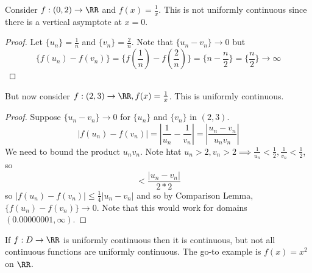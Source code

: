 \documentclass[12pt]{scrartcl}
\begin{document}
\begin{example}
  Consider $f: (0, 2) \to \RR$ and $f(x) = \frac{1}{x}$. This is not uniformly continuous
  since there is a vertical asymptote at $x=0$. 

  \begin{proof}
    Let $\{u_n\} = \frac{1}{n}$ and $\{v_n\} = \frac{2}{n}$. Note that $\{u_n - v_n\} \to 0$ but 
    \[\{f(u_n) - f(v_n)\} = \{f(\frac{1}{n}) - f(\frac{2}{n})\} = \{n - \frac{n}{2}\} = \{\frac{n}{2}\} \to \infty\]
  \end{proof}

  But now consider $f: (2, 3) \to \RR, f(x) = \frac{1}{x}$. This is uniformly continuous.

  \begin{proof}
    Suppose $\{u_n - v_n\} \to 0$ for $\{u_n\}$ and $\{v_n\}$ in $(2,3)$. 
    \[|f(u_n) - f(v_n)| = |\frac{1}{u_n} - \frac{1}{v_n}| = |\frac{u_n - v_n}{u_n v_n}|\]
    We need to bound the product $u_nv_n$. Note htat $u_n > 2, v_n > 2 \implies \frac{1}{u_n} < \frac{1}{2}, \frac{1}{v_n} < \frac{1}{2}$, 
    so 
    \[< \frac{|u_n - v_n|}{2 * 2}\]
    so $|f(u_n) - f(v_n)| \leq \frac{1}{4}|u_n - v_n|$ and so by Comparison Lemma, $\{f(u_n) - f(v_n)\} \to 0$.
    Note that this would work for domains $(0.00000001, \infty)$.
  \end{proof}
\end{example}

\begin{note}
  If $f: D \to \RR$ is uniformly continuous then it is continuous, but not all 
  continuous functions are uniformly continuous. The go-to example is 
  $f(x) = x^2$ on $\RR$.
\end{note}
\end{document}
